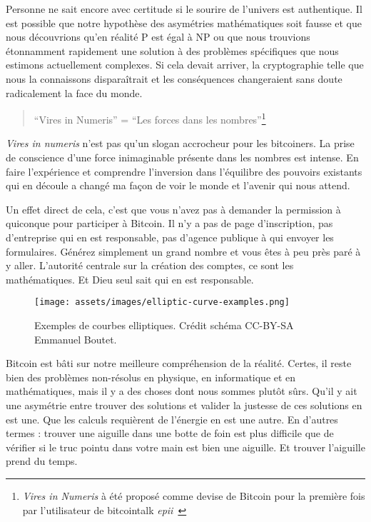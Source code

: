 Personne ne sait encore avec certitude si le sourire de l'univers est
authentique. Il est possible que notre hypothèse des asymétries mathématiques
soit fausse et que nous découvrions qu'en réalité P est égal à NP
\cite{wiki:pnp} ou que nous trouvions étonnamment rapidement une solution à des
problèmes spécifiques \cite{wiki:discrete-log} que nous estimons actuellement
complexes. Si cela devait arriver, la cryptographie telle que nous la
connaissons disparaîtrait et les conséquences changeraient sans doute
radicalement la face du monde.

\begin{quotation}\begin{samepage}
\enquote{Vires in Numeris} = \enquote{Les forces dans les
nombres}\footnote{\textit{Vires in Numeris} à été proposé comme devise de
Bitcoin pour la première fois par l'utilisateur de bitcointalk
\textit{epii}~\cite{epii}}
\end{samepage}\end{quotation}

\textit{Vires in numeris} n'est pas qu'un slogan accrocheur pour les bitcoiners.
La prise de conscience d'une force inimaginable présente dans les nombres est
intense. En faire l'expérience et comprendre l'inversion dans l'équilibre des
pouvoirs existants qui en découle a changé ma façon de voir le monde et l'avenir
qui nous attend.

Un effet direct de cela, c'est que vous n'avez pas à demander la permission à
quiconque pour participer à Bitcoin. Il n'y a pas de page d'inscription, pas
d'entreprise qui en est responsable, pas d'agence publique à qui envoyer les
formulaires. Générez simplement un grand nombre et vous êtes à peu près paré à y
aller. L'autorité centrale sur la création des comptes, ce sont les
mathématiques. Et Dieu seul sait qui en est responsable.

\begin{figure}
  \texttt{[image: assets/images/elliptic-curve-examples.png]}
  \caption{Exemples de courbes elliptiques. Crédit schéma CC-BY-SA Emmanuel
  Boutet.}
  \label{fig:elliptic-curve-examples}
\end{figure}

Bitcoin est bâti sur notre meilleure compréhension de la réalité. Certes, il
reste bien des problèmes non-résolus en physique, en informatique et en
mathématiques, mais il y a des choses dont nous sommes plutôt sûrs. Qu'il y ait
une asymétrie entre trouver des solutions et valider la justesse de ces
solutions en est une. Que les calculs requièrent de l'énergie en est une autre.
En d'autres termes : trouver une aiguille dans une botte de foin est plus
difficile que de vérifier si le truc pointu dans votre main est bien une
aiguille. Et trouver l'aiguille prend du temps.

